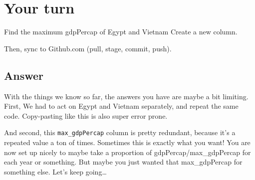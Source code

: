 \documentclass[]{book}
\newenvironment{Shaded}{\begin{snugshade}}{\end{snugshade}}
\newcommand{\KeywordTok}[1]{\textcolor[rgb]{0.13,0.29,0.53}{\textbf{{#1}}}}
\newcommand{\DataTypeTok}[1]{\textcolor[rgb]{0.13,0.29,0.53}{{#1}}}
\newcommand{\StringTok}[1]{\textcolor[rgb]{0.31,0.60,0.02}{{#1}}}
\newcommand{\CommentTok}[1]{\textcolor[rgb]{0.56,0.35,0.01}{\textit{{#1}}}}
\newcommand{\NormalTok}[1]{{#1}}
\theoremstyle{definition}
\theoremstyle{definition}
\theoremstyle{definition}
\theoremstyle{remark}
\begin{document}
\section{Your turn}\label{your-turn-7}

Find the maximum gdpPercap of Egypt and Vietnam Create a new column.

Then, sync to Github.com (pull, stage, commit, push).

\subsection{Answer}\label{answer-1}

\begin{Shaded}
\end{Shaded}

With the things we know so far, the answers you have are maybe a bit
limiting. First, We had to act on Egypt and Vietnam separately, and
repeat the same code. Copy-pasting like this is also super error prone.

And second, this \texttt{max\_gdpPercap} column is pretty redundant,
because it's a repeated value a ton of times. Sometimes this is exactly
what you want! You are now set up nicely to maybe take a proportion of
gdpPercap/max\_gdpPercap for each year or something. But maybe you just
wanted that max\_gdpPercap for something else. Let's keep going\ldots{}
\end{document}
